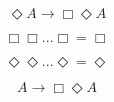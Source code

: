 \begin{equation} 
    \Diamond A \rightarrow \Box\Diamond A
\end{equation}
\label{diaaboxdiaa}

\begin{equation} 
    \Box\Box...\Box = \Box
\end{equation}
\label{alotbox}

\begin{equation} 
    \Diamond\Diamond...\Diamond = \Diamond
\end{equation}
\label{diamont}

\begin{equation} 
    A \rightarrow \Box\Diamond A
\end{equation}
\label{diamont}
